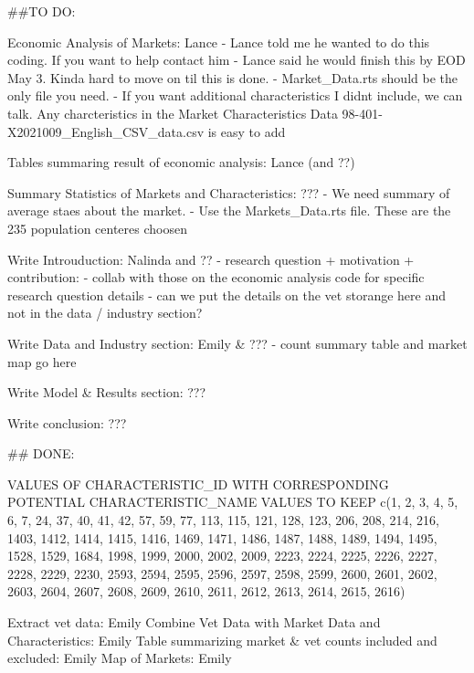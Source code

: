##TO DO:

Economic Analysis of Markets: Lance  
    - Lance told me he wanted to do this coding. If you want to help contact him  
    - Lance said he would finish this by EOD May 3. Kinda hard to move on til this is done.   
    - Market_Data.rts should be the only file you need. 
    - If you want additional characteristics I didnt include, we can talk. Any charcteristics in the Market Characteristics Data 98-401-X2021009_English_CSV_data.csv is easy to add

Tables summaring result of economic analysis: Lance (and ??)

Summary Statistics of Markets and Characteristics: ???
    - We need summary of average staes about the market. 
    - Use the Markets_Data.rts file. These are the 235 population centeres choosen

Write Introuduction: Nalinda and ??
    - research question + motivation + contribution: 
    - collab with those on the economic analysis code for specific research question details 
    - can we put the details on the vet storange here and not in the data / industry section? 

Write Data and Industry section: Emily & ???
    - count summary table and market map go here 

Write Model & Results section: ???

Write conclusion:  ???

## DONE: 

VALUES OF CHARACTERISTIC_ID WITH CORRESPONDING POTENTIAL CHARACTERISTIC_NAME VALUES TO KEEP 
c(1, 2, 3, 4, 5, 6, 7, 24, 37, 40, 41, 42, 57, 59, 77, 113, 115, 121, 128, 123, 206, 208, 214, 216, 1403, 1412, 1414, 1415, 1416, 1469, 1471, 1486, 1487, 1488, 1489, 1494, 1495, 1528, 1529, 1684, 1998, 1999, 2000, 2002, 2009, 2223, 2224, 2225, 2226, 2227, 2228, 2229, 2230, 2593, 2594, 2595, 2596, 2597, 2598, 2599, 2600, 2601, 2602, 2603, 2604, 2607, 2608, 2609, 2610, 2611, 2612, 2613, 2614, 2615, 2616)

Extract vet data: Emily 
Combine Vet Data with Market Data and Characteristics: Emily 
Table summarizing market & vet counts included and excluded: Emily
Map of Markets: Emily 
